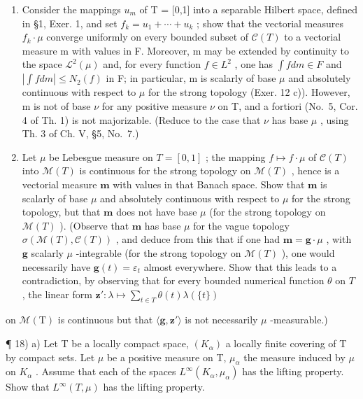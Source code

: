 \begin{enumerate}
\def\labelenumi{\arabic{enumi})}
\setcounter{enumi}{15}
\item
  Consider the mappings \(u_{m}\) of T = {[}0,1{]} into a separable Hilbert space, defined in §1, Exer. 1, and set \(f_{k} = u_{1} + \cdots + u_{k}\) ; show that the vectorial measures \(f_{k} \cdot \mu\) converge uniformly on every bounded subset of \(\mathcal{C}(T)\) to a vectorial measure m with values in F. Moreover, m may be extended by continuity to the space \(\mathcal{L}^{2}(\mu)\) and, for every function \(f \in L^{2}\) , one has \(\int f dm \in F\) and \(|\int f dm| \leqslant N_{2}(f)\) in F; in particular, m is scalarly of base \(\mu\) and absolutely continuous with respect to \(\mu\) for the strong topology (Exer. 12 c)). However, m is not of base \(\nu\) for any positive measure \(\nu\) on T, and a fortiori (No.~5, Cor. 4 of Th. 1) is not majorizable. (Reduce to the case that \(\nu\) has base \(\mu\) , using Th. 3 of Ch. V, §5, No.~7.)
\item
  Let \(\mu\) be Lebesgue measure on \(T = [0,1]\) ; the mapping \(f \mapsto f \cdot \mu\) of \(\mathcal{C}(T)\) into \(\mathcal{M}(T)\) is continuous for the strong topology on \(\mathcal{M}(T)\) , hence is a vectorial measure \(\mathbf{m}\) with values in that Banach space. Show that \(\mathbf{m}\) is scalarly of base \(\mu\) and absolutely continuous with respect to \(\mu\) for the strong topology, but that \(\mathbf{m}\) does not have base \(\mu\) (for the strong topology on \(\mathcal{M}(T)\) ). (Observe that \(\mathbf{m}\) has base \(\mu\) for the vague topology \(\sigma(\mathcal{M}(T), \mathcal{C}(T))\) , and deduce from this that if one had \(\mathbf{m} = \mathbf{g} \cdot \mu\) , with \(\mathbf{g}\) scalarly \(\mu\) -integrable (for the strong topology on \(\mathcal{M}(T)\) ), one would necessarily have \(\mathbf{g}(t) = \varepsilon_t\) almost everywhere. Show that this leads to a contradiction, by observing that for every bounded numerical function \(\theta\) on \(T\) , the linear form \(\mathbf{z}' : \lambda \mapsto \sum_{t \in T} \theta(t) \lambda(\{t\})\)
\end{enumerate}

on \(\mathcal{M}(\mathrm{T})\) is continuous but that \(\langle \mathbf{g},\mathbf{z}'\rangle\) is not necessarily \(\mu\) -measurable.)

¶ 18) a) Let T be a locally compact space, \((K_{\alpha})\) a locally finite covering of T by compact sets. Let \(\mu\) be a positive measure on T, \(\mu_{\alpha}\) the measure induced by \(\mu\) on \(K_{\alpha}\) . Assume that each of the spaces \(L^{\infty}(K_{\alpha}, \mu_{\alpha})\) has the lifting property. Show that \(L^{\infty}(T, \mu)\) has the lifting property.

